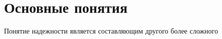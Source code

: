 










































      \thispagestyle{headings}





      


            \label{st\stat}


            


                        \vspace*{-9pt}


     


     \section{Основные понятия }


     


     Понятие надежности является составляющим другого более сложного 


